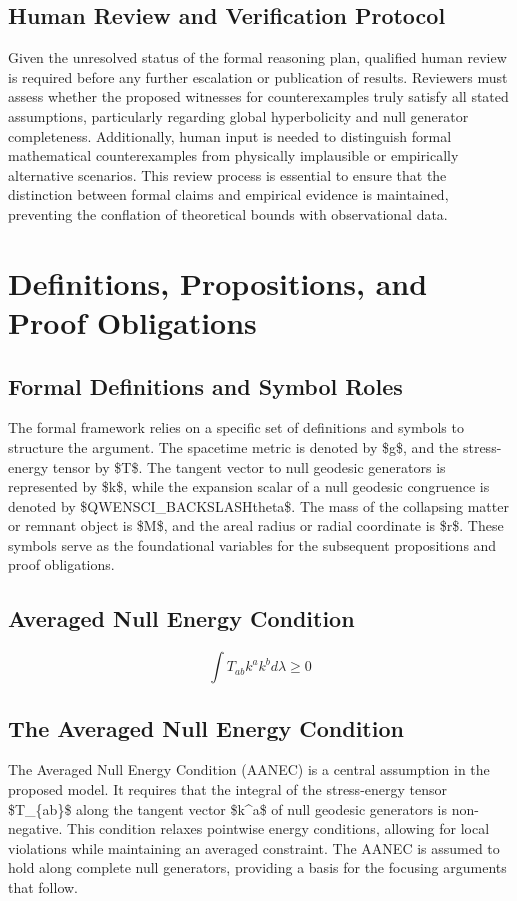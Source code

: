 \documentclass[conference]{IEEEtran}
\begin{document}
\subsection{Human Review and Verification Protocol}
Given the unresolved status of the formal reasoning plan, qualified human review is required before any further escalation or publication of results. Reviewers must assess whether the proposed witnesses for counterexamples truly satisfy all stated assumptions, particularly regarding global hyperbolicity and null generator completeness. Additionally, human input is needed to distinguish formal mathematical counterexamples from physically implausible or empirically alternative scenarios. This review process is essential to ensure that the distinction between formal claims and empirical evidence is maintained, preventing the conflation of theoretical bounds with observational data.

\section{Definitions, Propositions, and Proof Obligations}
\subsection{Formal Definitions and Symbol Roles}
The formal framework relies on a specific set of definitions and symbols to structure the argument. The spacetime metric is denoted by \$g\$, and the stress-energy tensor by \$T\$. The tangent vector to null geodesic generators is represented by \$k\$, while the expansion scalar of a null geodesic congruence is denoted by \$ QWENSCI\_BACKSLASH theta\$. The mass of the collapsing matter or remnant object is \$M\$, and the areal radius or radial coordinate is \$r\$. These symbols serve as the foundational variables for the subsequent propositions and proof obligations.

\subsection{Averaged Null Energy Condition}
\[
\int T_{ab} k^a k^b d\lambda \geq 0
\]

\subsection{The Averaged Null Energy Condition}
The Averaged Null Energy Condition (AANEC) is a central assumption in the proposed model. It requires that the integral of the stress-energy tensor \$T\_\{ab\}\$ along the tangent vector \$k\textasciicircum{}a\$ of null geodesic generators is non-negative. This condition relaxes pointwise energy conditions, allowing for local violations while maintaining an averaged constraint. The AANEC is assumed to hold along complete null generators, providing a basis for the focusing arguments that follow.
\end{document}
